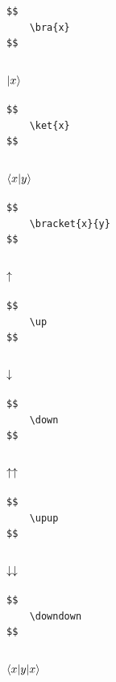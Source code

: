 \documentclass[a4paper]{article}
\begin{document}
\begin{verbatim}
$$
	\bra{x}
$$
\end{verbatim}

\subsubsection{$ |x\rangle$}

\begin{verbatim}
$$
	\ket{x}
$$
\end{verbatim}

\subsubsection{$ \langle x| y\rangle$}

\begin{verbatim}
$$
	\bracket{x}{y}
$$
\end{verbatim}

\subsubsection{$ \uparrow$}

\begin{verbatim}
$$
	\up
$$
\end{verbatim}

\subsubsection{$ \downarrow$}

\begin{verbatim}
$$
	\down
$$
\end{verbatim}

\subsubsection{$ \uparrow \uparrow$}

\begin{verbatim}
$$
	\upup
$$
\end{verbatim}

\subsubsection{$ \downarrow \downarrow$}

\begin{verbatim}
$$
	\downdown
$$
\end{verbatim}

\subsubsection{$  \langle x| y  |x\rangle$}
\end{document}
